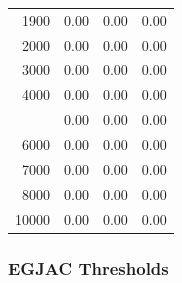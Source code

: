 \documentclass[12pt]{article}
\begin{document}
\begin{minipage}{0.5\textwidth}
\begin{tabular}{rccc}
   1900 & 0.00 & 0.00 & 0.00 \\ 
   2000 & 0.00 & 0.00 & 0.00 \\ 
   3000 & 0.00 & 0.00 & 0.00 \\ 
   4000 & 0.00 & 0.00 & 0.00 \\  \addlinespace
   5000 & 0.00 & 0.00 & 0.00 \\ 
   6000 & 0.00 & 0.00 & 0.00 \\ 
   7000 & 0.00 & 0.00 & 0.00 \\ 
   8000 & 0.00 & 0.00 & 0.00 \\ 
  10000 & 0.00 & 0.00 & 0.00 \\ 
\bottomrule
\end{tabular}

\end{minipage}





\subsubsection*{EGJAC Thresholds}
\end{document}
